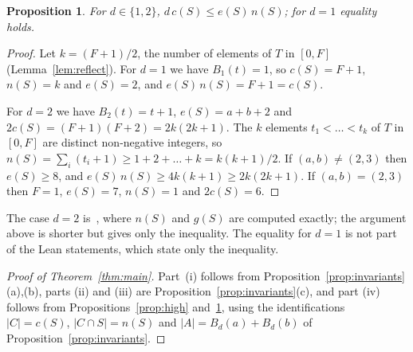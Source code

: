 \documentclass[11pt]{article}
\newtheorem{proposition}{Proposition}
\theoremstyle{definition}
\theoremstyle{remark}
\newcommand{\Bd}[2]{B_{#1}(#2)}
\begin{document}
\begin{proposition}\label{prop:low}
For $d\in\{1,2\}$, $d\,c(S)\le e(S)\,n(S)$; for $d=1$ equality holds.
\end{proposition}

\begin{proof}
Let $k=(F+1)/2$, the number of elements of $T$ in $[0,F]$
(Lemma~\ref{lem:reflect}). For $d=1$ we have $\Bd{1}{t}=1$, so $c(S)=F+1$,
$n(S)=k$ and $e(S)=2$, and $e(S)\,n(S)=F+1=c(S)$.

For $d=2$ we have $\Bd{2}{t}=t+1$, $e(S)=a+b+2$ and $2c(S)=(F+1)(F+2)=2k(2k+1)$.
The $k$ elements $t_1<\dots<t_k$ of $T$ in $[0,F]$ are distinct non-negative
integers, so
$n(S)=\sum_i(t_i+1)\ge 1+2+\dots+k=k(k+1)/2$. If $(a,b)\ne(2,3)$ then
$e(S)\ge 8$, and $e(S)\,n(S)\ge 4k(k+1)\ge 2k(2k+1)$. If $(a,b)=(2,3)$ then
$F=1$, $e(S)=7$, $n(S)=1$ and $2c(S)=6$.
\end{proof}

\noindent The case $d=2$ is~\cite[Theorem~5.5]{bcd}, where $n(S)$ and $g(S)$ are
computed exactly; the argument above is shorter but gives only the inequality.
The equality for $d=1$ is not part of the Lean statements, which state only the
inequality.

\begin{proof}[Proof of Theorem~\ref{thm:main}]
Part~(i) follows from Proposition~\ref{prop:invariants}(a),(b), parts (ii) and
(iii) are Proposition~\ref{prop:invariants}(c), and part (iv) follows from
Propositions~\ref{prop:high} and~\ref{prop:low}, using the identifications
$|C|=c(S)$, $|C\cap S|=n(S)$ and $|A|=\Bd{d}{a}+\Bd{d}{b}$ of
Proposition~\ref{prop:invariants}.
\end{proof}
\end{document}

